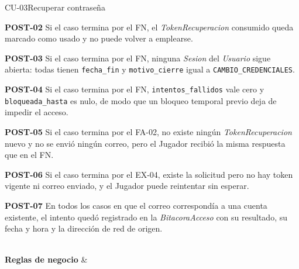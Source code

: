 \begin{fichacu}{CU-03}{Recuperar contraseña}
{\begin{cureglas}
      \item \textbf{\mbox{POST-02}} Si el caso termina por el FN, el \textit{TokenRecuperacion} consumido queda marcado como usado y no puede volver a emplearse.
      \item \textbf{\mbox{POST-03}} Si el caso termina por el FN, ninguna \textit{Sesion} del \textit{Usuario} sigue abierta: todas tienen \texttt{fecha\_\allowbreak{}fin} y \texttt{motivo\_\allowbreak{}cierre} igual a \texttt{CAMBIO\_\allowbreak{}CREDENCIALES}.
      \item \textbf{\mbox{POST-04}} Si el caso termina por el FN, \texttt{intentos\_\allowbreak{}fallidos} vale cero y \texttt{bloqueada\_\allowbreak{}hasta} es nulo, de modo que un bloqueo temporal previo deja de impedir el acceso.
      \item \textbf{\mbox{POST-05}} Si el caso termina por el \mbox{FA-02}, no existe ningún \textit{TokenRecuperacion} nuevo y no se envió ningún correo, pero el Jugador recibió la misma respuesta que en el FN.
      \item \textbf{\mbox{POST-06}} Si el caso termina por el \mbox{EX-04}, existe la solicitud pero no hay token vigente ni correo enviado, y el Jugador puede reintentar sin esperar.
      \item \textbf{\mbox{POST-07}} En todos los casos en que el correo correspondía a una cuenta existente, el intento quedó registrado en la \textit{BitacoraAcceso} con su resultado, su fecha y hora y la dirección de red de origen.
    \end{cureglas}} \\ \hline
  \textbf{Reglas de negocio} & 
\end{fichacu}
